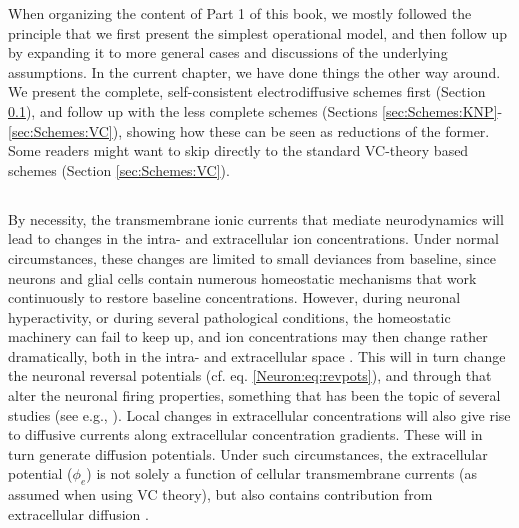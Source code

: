 When organizing the content of Part 1 of this book, we mostly followed the principle that we first present the simplest operational model, and then follow up by expanding it to more general cases and discussions of the underlying assumptions. In the current chapter, we have done things the other way around. We present the complete, self-consistent electrodiffusive schemes first (Section \ref{sec:Schemes:complete}), and follow up with the less complete schemes (Sections \ref{sec:Schemes:KNP}-\ref{sec:Schemes:VC}), showing how these can be seen as reductions of the former. 
Some readers might want to skip directly to the standard VC-theory based schemes (Section \ref{sec:Schemes:VC}).



\subsection{}
\label{sec:Schemes:complete}
By necessity, the transmembrane ionic currents that mediate neurodynamics will lead to changes in the intra- and extracellular ion concentrations. Under normal circumstances, these changes are limited to small deviances from baseline, since neurons and glial cells contain numerous homeostatic mechanisms that work continuously to restore baseline concentrations. However, during neuronal hyperactivity, or during several pathological conditions, the homeostatic machinery can fail to keep up, and ion concentrations may then change rather dramatically, both in the intra- and extracellular space \citep{Dietzel1989, Somjen2001, Frohlich2008, Zandt2015, Ayata2015}. This will in turn change the neuronal reversal potentials (cf. eq. \ref{Neuron:eq:revpots}), and through that alter the neuronal firing properties, something that has been the topic of several studies (see e.g., \citep{Qian1989, Cressman2009, Zandt2011, Oyehaug2012, WeiUllahSchiff2014, Saetra2020}). Local changes in extracellular concentrations will also give rise to diffusive currents along extracellular concentration gradients. These will in turn generate diffusion potentials. Under such circumstances, the extracellular potential ($\phi_e$) is not solely a function of cellular transmembrane currents (as assumed when using VC theory), but also contains contribution from extracellular diffusion \citep{Halnes2016}. 

